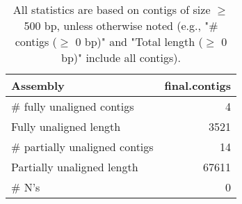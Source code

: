 \documentclass[12pt,a4paper]{article}
\begin{document}
\begin{table}[ht]
\begin{center}
\caption{All statistics are based on contigs of size $\geq$ 500 bp, unless otherwise noted (e.g., "\# contigs ($\geq$ 0 bp)" and "Total length ($\geq$ 0 bp)" include all contigs).}
\begin{tabular}{|l*{1}{|r}|}
\hline
Assembly & final.contigs \\ \hline
\# fully unaligned contigs & 4 \\ \hline
Fully unaligned length & 3521 \\ \hline
\# partially unaligned contigs & 14 \\ \hline
Partially unaligned length & 67611 \\ \hline
\# N's & 0 \\ \hline
\end{tabular}
\end{center}
\end{table}
\end{document}
